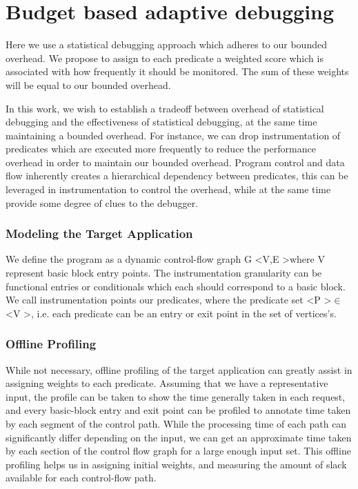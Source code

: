 \section{Budget based adaptive debugging}
\label{sec:adaptive}

Here we use a statistical debugging approach which adheres to our bounded overhead.
We propose to assign to each predicate a weighted score which is associated with how frequently it should be monitored.
The sum of these weights will be equal to our bounded overhead.

In this work, we wish to establish a tradeoff between overhead of statistical debugging and the effectiveness of statistical debugging, at the same time maintaining a bounded overhead.
For instance, we can drop instrumentation of predicates which are executed more frequently to reduce the performance overhead in order to maintain our bounded overhead.
Program control and data flow inherently creates a hierarchical dependency between predicates, this can be leveraged in instrumentation to control the overhead, while at the same time provide some degree of clues to the debugger.

\subsubsection{Modeling the Target Application}

We define the program as a dynamic control-flow graph G \textless V,E \textgreater where V represent basic block entry points. 
The instrumentation granularity can be functional entries or conditionals which each should correspond to a basic block.
We call instrumentation points our predicates, where the predicate set \textless P \textgreater $\in$ \textless V \textgreater, 
i.e. each predicate can be an entry or exit point in the set of vertices's.


\subsubsection{Offline Profiling}

While not necessary, offline profiling of the target application can greatly assist in assigning weights to each predicate. 
Assuming that we have a representative input, the profile can be taken to show the time generally taken in each request, 
and every basic-block entry and exit point can be profiled to annotate time taken by each segment of the control path. 
While the processing time of each path can significantly differ depending on the input, 
we can get an approximate time taken by each section of the control flow graph for a large enough input set. 
This offline profiling helps us in assigning initial weights, and measuring the amount of slack available for each control-flow path.

